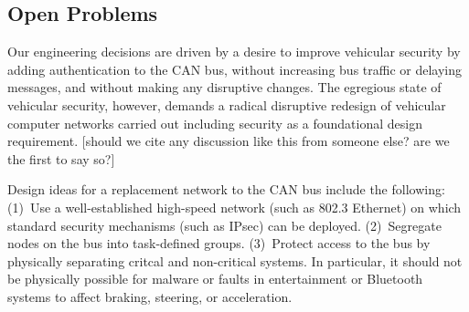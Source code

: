 	




\subsection{Open Problems}
\label{open}

Our engineering decisions are driven by a desire to improve vehicular security by adding authentication
to the CAN bus, without increasing bus traffic or delaying messages, and without making any
disruptive changes.  The egregious state of vehicular security, however, demands a radical disruptive
redesign of vehicular computer networks carried out including security as a foundational design
requirement. [should we cite any discussion like this from someone else?  are we the first to say so?]

Design ideas for a replacement network to the CAN bus include the following:  
(1)~Use a well-established high-speed network (such as 802.3 Ethernet) on which
standard security mechanisms (such as IPsec) can be deployed.
(2)~Segregate nodes on the bus into task-defined groups.
(3)~Protect access to the bus by physically separating critcal and non-critical systems.
In particular, it should not be physically possible for malware or faults in entertainment or 
Bluetooth systems to affect braking, steering, or acceleration.  


